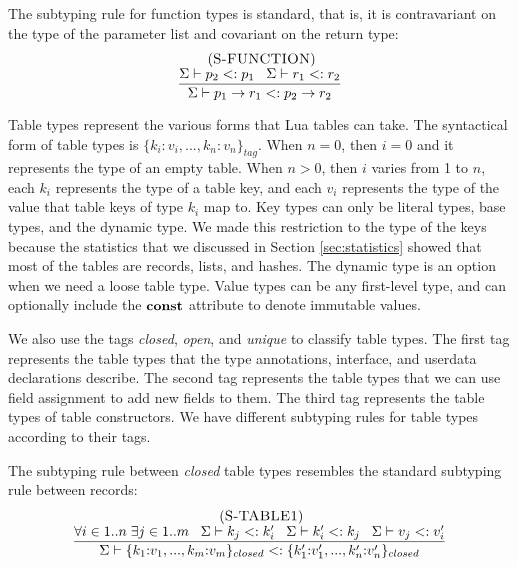 The subtyping rule for function types is standard, that is, it is
contravariant on the type of the parameter list and
covariant on the return type:
\[
\begin{array}{c}
\; (\textsc{S-FUNCTION})\\
\dfrac{\Sigma \vdash p_{2} <: p_{1} \;\;\;
       \Sigma \vdash r_{1} <: r_{2}}
      {\Sigma \vdash p_{1} \rightarrow r_{1} <: p_{2} \rightarrow r_{2}}
\end{array}
\]

Table types represent the various forms that Lua tables can take.
The syntactical form of table types is $\{ k_{i}{:}v_{i}, ..., k_{n}{:}v_{n} \}_{tag}$.
When $n = 0$, then $i = 0$ and it represents the type of an empty table.
When $n > 0$, then $i$ varies from 1 to $n$, each $k_{i}$ represents
the type of a table key, and each $v_{i}$ represents the type of the
value that table keys of type $k_{i}$ map to.
Key types can only be literal types, base types, and the dynamic type.
We made this restriction to the type of the keys because the statistics
that we discussed in Section \ref{sec:statistics} showed that most
of the tables are records, lists, and hashes.
The dynamic type is an option when we need a loose table type.
Value types can be any first-level type, and can optionally include
the $\mathbf{const}$ attribute to denote immutable values.

We also use the tags \emph{closed}, \emph{open}, and \emph{unique}
to classify table types.
The first tag represents the table types that the type annotations,
interface, and userdata declarations describe.
The second tag represents the table types that we can use field assignment
to add new fields to them.
The third tag represents the table types of table constructors.
We have different subtyping rules for table types according to their
tags.

The subtyping rule between \emph{closed} table types resembles the
standard subtyping rule between records:
\[
\begin{array}{c}
\; (\textsc{S-TABLE1})\\
\dfrac{\forall i \in 1..n \; \exists j \in 1..m \;\;\;
       \Sigma \vdash k_{j} <: k_{i}' \;\;\;
       \Sigma \vdash k_{i}' <: k_{j} \;\;\;
       \Sigma \vdash v_{j} <: v_{i}'}
      {\Sigma \vdash \{k_{1}{:}v_{1}, ..., k_{m}{:}v_{m}\}_{closed} <: \{k_{1}'{:}v_{1}', ..., k_{n}'{:}v_{n}'\}_{closed}}
\end{array}
\]

